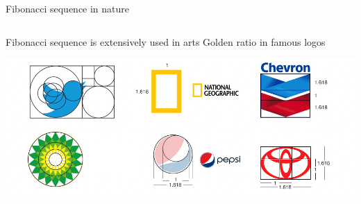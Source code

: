 \begin{frame}[t]{Fibonacci sequence in nature}
\begin{columns}
\begin{column}{0.4\textwidth}
    \end{column}
    
\end{columns}
\end{frame}

\begin{frame}{Fibonacci sequence is extensively used in arts}
Golden ratio in famous logos
\begin{center}
    \includegraphics[scale=0.3]{lesson_1/images/fibonacci_logos.png}
\end{center}
\end{frame}



